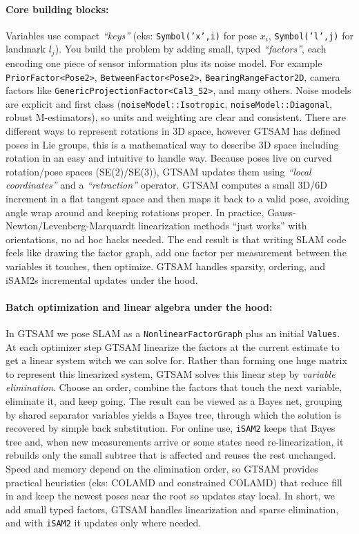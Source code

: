 \paragraph{Core building blocks:}
Variables use compact \textit{``keys''} (eks: \texttt{Symbol('x',i)} for pose $x_i$, \texttt{Symbol('l',j)} for landmark $l_j$). You build the problem by adding small, typed \textit{``factors''}, each encoding one piece of sensor information plus its noise model. For example \texttt{PriorFactor<Pose2>}, \texttt{BetweenFactor<Pose2>}, \texttt{BearingRangeFactor2D}, camera factors like \texttt{GenericProjectionFactor<Cal3\_S2>}, and many others. Noise models are explicit and first class (\texttt{noiseModel::Isotropic}, \texttt{noiseModel::Diagonal}, robust M-estimators), so units and weighting are clear and consistent. There are different ways to represent rotations in 3D space, however GTSAM has defined poses in Lie groups, this is a mathematical way to describe 3D space including rotation in an easy and intuitive to handle way. Because poses live on curved rotation/pose spaces (SE(2)/SE(3)), GTSAM updates them using \textit{``local coordinates''} and a \textit{``retraction''} operator. GTSAM computes a small 3D/6D increment in a flat tangent space and then maps it back to a valid pose, avoiding angle wrap around and keeping rotations proper. In practice, Gauss-Newton/Levenberg-Marquardt linearization methods ``just works'' with orientations, no ad hoc hacks needed. The end result is that writing SLAM code feels like drawing the factor graph, add one factor per measurement between the variables it touches, then optimize. GTSAM handles sparsity, ordering, and iSAM2s incremental updates under the hood. \cite{GTSAM_handbook}

\paragraph{Batch optimization and linear algebra under the hood:}
In GTSAM we pose SLAM as a \texttt{NonlinearFactorGraph} plus an initial \texttt{Values}. At each optimizer step GTSAM linearize the factors at the current estimate to get a linear system witch we can solve for. Rather than forming one huge matrix to represent this linearized system, GTSAM solves this linear step by \emph{variable elimination}. Choose an order, combine the factors that touch the next variable, eliminate it, and keep going. The result can be viewed as a Bayes net, grouping by shared separator variables yields a Bayes tree, through which the solution is recovered by simple back substitution. For online use, \texttt{iSAM2} keeps that Bayes tree and, when new measurements arrive or some states need re-linearization, it rebuilds only the small subtree that is affected and reuses the rest unchanged. Speed and memory depend on the elimination order, so GTSAM provides practical heuristics (eks: COLAMD and constrained COLAMD) that reduce fill in and keep the newest poses near the root so updates stay local. In short, we add small typed factors, GTSAM handles linearization and sparse elimination, and with \texttt{iSAM2} it updates only where needed. \cite{GTSAM_handbook}


